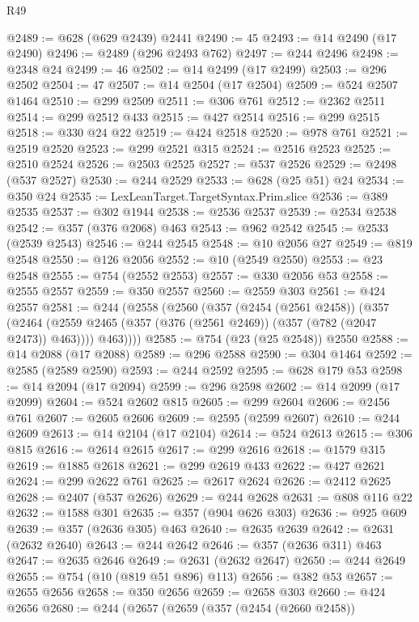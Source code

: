 \begin{lexlean}{R49}
\begin{coremodule}
@2489 := @628 (@629 @2439) @2441
@2490 := 45
@2493 := @14 @2490 (@17 @2490)
@2496 := @2489 (@296 @2493 @762)
@2497 := @244 @2496
@2498 := @2348 @24
@2499 := 46
@2502 := @14 @2499 (@17 @2499)
@2503 := @296 @2502
@2504 := 47
@2507 := @14 @2504 (@17 @2504)
@2509 := @524 @2507 @1464
@2510 := @299 @2509
@2511 := @306 @761
@2512 := @2362 @2511
@2514 := @299 @2512 @433
@2515 := @427 @2514
@2516 := @299 @2515
@2518 := @330 @24 @22
@2519 := @424 @2518
@2520 := @978 @761
@2521 := @2519 @2520
@2523 := @299 @2521 @315
@2524 := @2516 @2523
@2525 := @2510 @2524
@2526 := @2503 @2525
@2527 := @537 @2526
@2529 := @2498 (@537 @2527)
@2530 := @244 @2529
@2533 := @628 (@25 @51) @24
@2534 := @350 @24
@2535 := LexLeanTarget.TargetSyntax.Prim.slice
@2536 := @389 @2535
@2537 := @302 @1944
@2538 := @2536 @2537
@2539 := @2534 @2538
@2542 := @357 (@376 @2068) @463
@2543 := @962 @2542
@2545 := @2533 (@2539 @2543)
@2546 := @244 @2545
@2548 := @10 @2056 @27
@2549 := @819 @2548
@2550 := @126 @2056
@2552 := @10 (@2549 @2550)
@2553 := @23 @2548
@2555 := @754 (@2552 @2553)
@2557 := @330 @2056 @53
@2558 := @2555 @2557
@2559 := @350 @2557
@2560 := @2559 @303
@2561 := @424 @2557
@2581 := @244
    (@2558
      (@2560
        (@357
          (@2454 (@2561 @2458))
          (@357
            (@2464 (@2559 @2465 (@357 (@376 (@2561 @2469)) (@357 (@782 (@2047 @2473)) @463))))
            @463))))
@2585 := @754 (@23 (@25 @2548)) @2550
@2588 := @14 @2088 (@17 @2088)
@2589 := @296 @2588
@2590 := @304 @1464
@2592 := @2585 (@2589 @2590)
@2593 := @244 @2592
@2595 := @628 @179 @53
@2598 := @14 @2094 (@17 @2094)
@2599 := @296 @2598
@2602 := @14 @2099 (@17 @2099)
@2604 := @524 @2602 @815
@2605 := @299 @2604
@2606 := @2456 @761
@2607 := @2605 @2606
@2609 := @2595 (@2599 @2607)
@2610 := @244 @2609
@2613 := @14 @2104 (@17 @2104)
@2614 := @524 @2613
@2615 := @306 @815
@2616 := @2614 @2615
@2617 := @299 @2616
@2618 := @1579 @315
@2619 := @1885 @2618
@2621 := @299 @2619 @433
@2622 := @427 @2621
@2624 := @299 @2622 @761
@2625 := @2617 @2624
@2626 := @2412 @2625
@2628 := @2407 (@537 @2626)
@2629 := @244 @2628
@2631 := @808 @116 @22
@2632 := @1588 @301
@2635 := @357 (@904 @626 @303)
@2636 := @925 @609
@2639 := @357 (@2636 @305) @463
@2640 := @2635 @2639
@2642 := @2631 (@2632 @2640)
@2643 := @244 @2642
@2646 := @357 (@2636 @311) @463
@2647 := @2635 @2646
@2649 := @2631 (@2632 @2647)
@2650 := @244 @2649
@2655 := @754 (@10 (@819 @51 @896) @113)
@2656 := @382 @53
@2657 := @2655 @2656
@2658 := @350 @2656
@2659 := @2658 @303
@2660 := @424 @2656
@2680 := @244
    (@2657
      (@2659
        (@357
          (@2454 (@2660 @2458))

\end{coremodule}
\end{lexlean}
